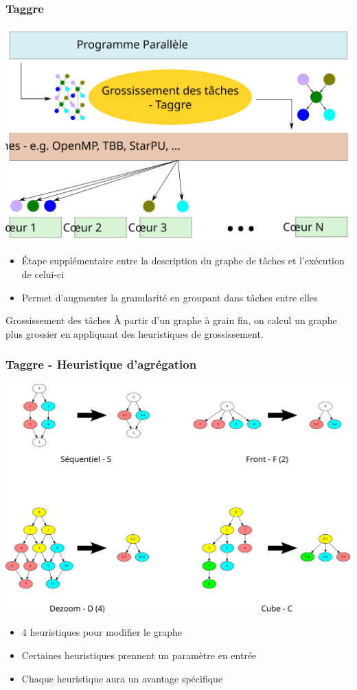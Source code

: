 \documentclass{beamer}
\begin{document}
\begin{frame}
  \frametitle{Taggre}

  \centerline{\includegraphics[width=0.55\linewidth]{coarsening}}

  \begin{itemize}
    \item \'Etape supplémentaire entre la description du graphe de tâches et l'exécution de celui-ci
    \item Permet d'augmenter la granularité en groupant dans tâches entre elles
  \end{itemize}

  \begin{block}{Grossissement des tâches}
    \`A partir d'un graphe à grain fin, on calcul un graphe plus grossier en appliquant
    des heuristiques de grossissement.
  \end{block}
\end{frame}


\begin{frame}
  \frametitle{Taggre - Heuristique d'agrégation}

  \centerline{\includegraphics[width=0.80\linewidth]{all_algo}}

  \begin{itemize}
    \item 4 heuristiques pour modifier le graphe
    \item Certaines heuristiques prennent un paramètre en entrée
    \item Chaque heuristique aura un avantage spécifique
  \end{itemize}
\end{frame}
\end{document}
